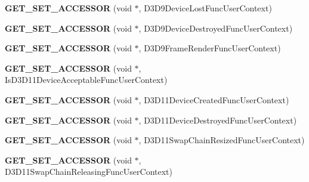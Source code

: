 \begin{DoxyCompactItemize}
\item 
\hypertarget{class_d_x_u_t_state_aef37e94e5b3ecd90469ed068cf48264c}{{\bfseries G\+E\+T\+\_\+\+S\+E\+T\+\_\+\+A\+C\+C\+E\+S\+S\+O\+R} (void $\ast$, D3\+D9\+Device\+Lost\+Func\+User\+Context)}\label{class_d_x_u_t_state_aef37e94e5b3ecd90469ed068cf48264c}

\item 
\hypertarget{class_d_x_u_t_state_a52b78625c6e4f3db2000c2ce571755c1}{{\bfseries G\+E\+T\+\_\+\+S\+E\+T\+\_\+\+A\+C\+C\+E\+S\+S\+O\+R} (void $\ast$, D3\+D9\+Device\+Destroyed\+Func\+User\+Context)}\label{class_d_x_u_t_state_a52b78625c6e4f3db2000c2ce571755c1}

\item 
\hypertarget{class_d_x_u_t_state_a3d8e9295efb9ecacbb688be3c1aea960}{{\bfseries G\+E\+T\+\_\+\+S\+E\+T\+\_\+\+A\+C\+C\+E\+S\+S\+O\+R} (void $\ast$, D3\+D9\+Frame\+Render\+Func\+User\+Context)}\label{class_d_x_u_t_state_a3d8e9295efb9ecacbb688be3c1aea960}

\item 
\hypertarget{class_d_x_u_t_state_a7ff11a0e7be31603ed68671a97274c68}{{\bfseries G\+E\+T\+\_\+\+S\+E\+T\+\_\+\+A\+C\+C\+E\+S\+S\+O\+R} (void $\ast$, Is\+D3\+D11\+Device\+Acceptable\+Func\+User\+Context)}\label{class_d_x_u_t_state_a7ff11a0e7be31603ed68671a97274c68}

\item 
\hypertarget{class_d_x_u_t_state_adb6fc40d82f322ce80cc525ab0089c3e}{{\bfseries G\+E\+T\+\_\+\+S\+E\+T\+\_\+\+A\+C\+C\+E\+S\+S\+O\+R} (void $\ast$, D3\+D11\+Device\+Created\+Func\+User\+Context)}\label{class_d_x_u_t_state_adb6fc40d82f322ce80cc525ab0089c3e}

\item 
\hypertarget{class_d_x_u_t_state_aeb2ffa4eae86e9fc7da9ae5d26a57201}{{\bfseries G\+E\+T\+\_\+\+S\+E\+T\+\_\+\+A\+C\+C\+E\+S\+S\+O\+R} (void $\ast$, D3\+D11\+Device\+Destroyed\+Func\+User\+Context)}\label{class_d_x_u_t_state_aeb2ffa4eae86e9fc7da9ae5d26a57201}

\item 
\hypertarget{class_d_x_u_t_state_a50525e293d424b88e241506d5edfb696}{{\bfseries G\+E\+T\+\_\+\+S\+E\+T\+\_\+\+A\+C\+C\+E\+S\+S\+O\+R} (void $\ast$, D3\+D11\+Swap\+Chain\+Resized\+Func\+User\+Context)}\label{class_d_x_u_t_state_a50525e293d424b88e241506d5edfb696}

\item 
\hypertarget{class_d_x_u_t_state_a8a33332a865e27d8e6bf000e102d2eaf}{{\bfseries G\+E\+T\+\_\+\+S\+E\+T\+\_\+\+A\+C\+C\+E\+S\+S\+O\+R} (void $\ast$, D3\+D11\+Swap\+Chain\+Releasing\+Func\+User\+Context)}\label{class_d_x_u_t_state_a8a33332a865e27d8e6bf000e102d2eaf}


\end{DoxyCompactItemize}
